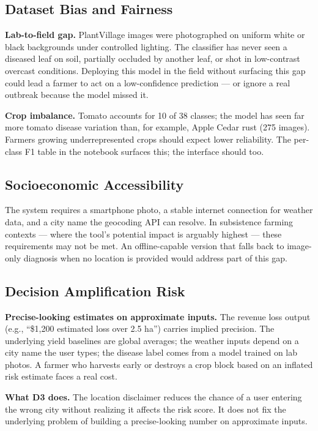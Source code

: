\documentclass[conference]{IEEEtran}
\begin{document}
\subsection{Dataset Bias and Fairness}

\textbf{Lab-to-field gap.} PlantVillage images were photographed on uniform white or black backgrounds under controlled lighting. The classifier has never seen a diseased leaf on soil, partially occluded by another leaf, or shot in low-contrast overcast conditions. Deploying this model in the field without surfacing this gap could lead a farmer to act on a low-confidence prediction --- or ignore a real outbreak because the model missed it.

\textbf{Crop imbalance.} Tomato accounts for 10 of 38 classes; the model has seen far more tomato disease variation than, for example, Apple Cedar rust (275 images). Farmers growing underrepresented crops should expect lower reliability. The per-class F1 table in the notebook surfaces this; the interface should too.

\subsection{Socioeconomic Accessibility}

The system requires a smartphone photo, a stable internet connection for weather data, and a city name the geocoding API can resolve. In subsistence farming contexts --- where the tool's potential impact is arguably highest --- these requirements may not be met. An offline-capable version that falls back to image-only diagnosis when no location is provided would address part of this gap.

\subsection{Decision Amplification Risk}

\textbf{Precise-looking estimates on approximate inputs.} The revenue loss output (e.g., ``\$1,200 estimated loss over 2.5 ha'') carries implied precision. The underlying yield baselines are global averages; the weather inputs depend on a city name the user types; the disease label comes from a model trained on lab photos. A farmer who harvests early or destroys a crop block based on an inflated risk estimate faces a real cost.

\textbf{What D3 does.} The location disclaimer reduces the chance of a user entering the wrong city without realizing it affects the risk score. It does not fix the underlying problem of building a precise-looking number on approximate inputs.
\end{document}
